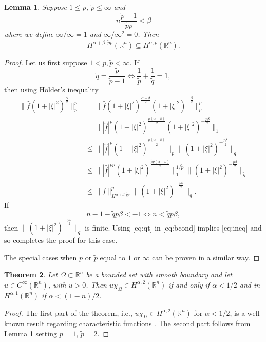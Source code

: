 \documentclass[a4paper,12pt]{amsart}
\numberwithin{equation}{section}
\theoremstyle{plain}
\newtheorem{theorem}{Theorem}
\numberwithin{theorem}{section}
\newtheorem{lemma}[theorem]{Lemma}
\theoremstyle{definition}
\theoremstyle{remark}
\theoremstyle{remark}
\theoremstyle{remark}
\begin{document}
\begin{lemma} \label{lem:Hsa_cont}
    Suppose $1 \leq p$, $\widetilde{p} \leq \infty$ and
\begin{equation}\label{eq:bcond}
    n\frac{\widetilde{p} - 1}{\widetilde{p}p}< \beta
\end{equation}
where we define $\infty/\infty = 1$ and $\infty/\infty^2 = 0$.
Then
\[H^{\alpha+\beta,\widetilde{p}p}(\mathbb{R}^n) \subseteq H^{\alpha,p}(\mathbb{R}^n).
\]
\end{lemma}
\begin{proof}
    Let us first suppose $1< p, \widetilde{p}<\infty$. If
    \begin{equation}\label{eq:qt}
    \widetilde{q}= \frac{\widetilde{p}}{\widetilde{p}-1} \Leftrightarrow \frac{1}{\widetilde{p}}+ \frac{1}{\widetilde{q}} = 1,
    \end{equation}
    then using H\"older's inequality
    \[
    \begin{split}
    \|\widehat{f}(1+|\xi|^2)^{\frac{\alpha}{2}}\|^p_p &  = \| \widehat{f} (1+|\xi|^2)^{\frac{\alpha+\beta}{2}} (1+|\xi|^2)^{-\frac{\beta}{2}}\|^p_p\\
    & = \| |\widehat{f}|^p (1+|\xi|^2)^{\frac{p(\alpha+\beta)}{2}} (1+|\xi|^2)^{-\frac{p\beta}{2}}\|_1\\
    & \leq \||\widehat{f}|^p (1+|\xi|^2)^{\frac{p(\alpha+\beta)}{2}}\|_{\widetilde{p}} \| (1+|\xi|^2)^{-\frac{p\beta}{2}}\|_{\widetilde{q}}\\
    & \leq \| |\widehat{f}|^{\widetilde{p}p} (1+|\xi|^2)^{\frac{\widetilde{p}p(\alpha+\beta)}{2}}\|_{1}^{1/\widetilde{p}}\| (1+|\xi|^2)^{-\frac{p\beta}{2}}\|_{\widetilde{q}}\\
    & \leq \|f\|_{H^{\alpha+\beta,\widetilde{p}p}}^p \| (1+|\xi|^2)^{-\frac{p\beta}{2}}\|_{\widetilde{q}}.
    \end{split}
    \]
    If
    \begin{equation}\label{eq:ineq}
    n-1-\widetilde{q}p\beta < -1 \Leftrightarrow n < \widetilde{q}p\beta,
    \end{equation}
    then $\| (1+|\xi|^2)^{-\frac{p\beta}{2}}\|_{\widetilde{q}}$ is finite. Using \eqref{eq:qt} in \eqref{eq:bcond} implies \eqref{eq:ineq} and so completes the proof for this case. 
    
    The special cases when $p$ or $\widetilde{p}$ equal to $1$ or $\infty$ can be proven in a similar way.
\end{proof}

\begin{theorem}\label{char_sobo}
    Let $\Omega \subset \mathbb{R}^n$ be a bounded set with smooth boundary and let $u\in C^\infty(\mathbb{R}^n)$, with $u > 0$. Then $u\chi_\Omega \in H^{\alpha,2}(\mathbb{R}^n)$ if and only if $\alpha < 1/2$ and in $H^{\alpha,1}(\mathbb{R}^n)$ if $\alpha < (1-n)/2$.
\end{theorem}
\begin{proof}
The first part of the theorem, i.e., $u\chi_\Omega \in H^{\alpha,2}(\mathbb{R}^n)$ for $\alpha < 1/2$, is a well known result regarding characteristic functions \cite[page 92]{natterer}. The second part follows from Lemma \ref{lem:Hsa_cont} setting $p = 1$, $\tilde{p} = 2$.
\end{proof}
\end{document}
